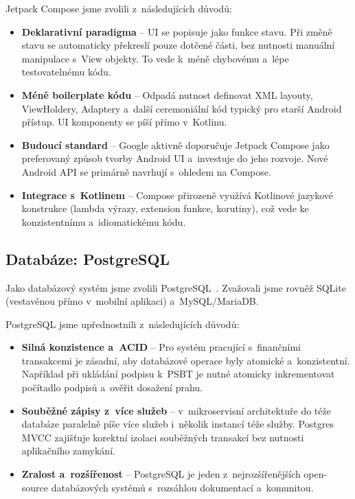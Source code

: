 Jetpack Compose jsme zvolili z~následujících důvodů:

\begin{itemize}
\item \textbf{Deklarativní paradigma} -- UI se popisuje jako funkce stavu.
  Při změně stavu se automaticky překreslí pouze dotčené části, bez nutnosti
  manuální manipulace s~View objekty. To vede k~méně chybovému a~lépe
  testovatelnému kódu.
\item \textbf{Méně boilerplate kódu} -- Odpadá nutnost definovat
  XML layouty, View\-Holdery, Adaptery a~další ceremoniální kód
  typický pro starší Android přístup. UI komponenty se píší přímo
  v~Kotlinu.
\item \textbf{Budoucí standard} -- Google aktivně doporučuje Jetpack Compose
  jako preferovaný způsob tvorby Android UI a~investuje do jeho rozvoje.
  Nové Android API se primárně navrhují s~ohledem na Compose.
\item \textbf{Integrace s~Kotlinem} -- Compose přirozeně využívá Kotlinové
  jazykové konstrukce (lambda výrazy, extension funkce, korutiny), což vede
  ke konzistentnímu a~idiomatickému kódu.
\end{itemize}

\subsection{Databáze: PostgreSQL}

Jako databázový systém jsme zvolili PostgreSQL~\cite{PostgreSQL}. Zvažovali
jsme rovněž SQLite (vestavěnou přímo v~mobilní aplikaci) a~MySQL/MariaDB.

PostgreSQL jsme upřednostnili z~následujících důvodů:

\begin{itemize}
\item \textbf{Silná konzistence a~ACID} -- Pro systém pracující s~finančními
  transakcemi je zásadní, aby databázové operace byly atomické a~konzistentní.
  Například při ukládání podpisu k~PSBT je nutné atomicky inkrementovat
  počítadlo podpisů a~ověřit dosažení prahu.
\item \textbf{Souběžné zápisy z~více služeb} -- v~mikroservisní architektuře
  do téže databáze paralelně píše více služeb i~několik instancí téže
  služby. Postgres MVCC zajišťuje korektní izolaci souběžných transakcí
  bez nutnosti aplikačního zamykání.
\item \textbf{Zralost a~rozšířenost} -- PostgreSQL je jeden z~nejrozšířenějších
  open-source databázových systémů s~rozsáhlou dokumentací a~komunitou.
\end{itemize}

